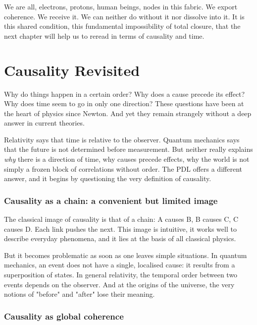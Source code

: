 \documentclass[12pt, a4paper, openright]{book}
\begin{document}
\medskip

We are all, electrons, protons, human beings, nodes in this fabric. We export coherence. We receive it. We can neither do without it nor dissolve into it. It is this shared condition, this fundamental impossibility of total closure, that the next chapter will help us to reread in terms of causality and time.

\chapter{Causality Revisited}

Why do things happen in a certain order? Why does a cause precede its effect? Why does time seem to go in only one direction? These questions have been at the heart of physics since Newton. And yet they remain strangely without a deep answer in current theories.

\medskip

Relativity says that time is relative to the observer. Quantum mechanics says that the future is not determined before measurement. But neither really explains \emph{why} there is a direction of time, why causes precede effects, why the world is not simply a frozen block of correlations without order. The PDL offers a different answer, and it begins by questioning the very definition of causality.

\subsection*{Causality as a chain: a convenient but limited image}

The classical image of causality is that of a chain: A causes B, B causes C, C causes D. Each link pushes the next. This image is intuitive, it works well to describe everyday phenomena, and it lies at the basis of all classical physics.

\medskip

But it becomes problematic as soon as one leaves simple situations. In quantum mechanics, an event does not have a single, localised cause: it results from a superposition of states. In general relativity, the temporal order between two events depends on the observer. And at the origins of the universe, the very notions of "before" and "after" lose their meaning.

\subsection*{Causality as global coherence}
\end{document}
